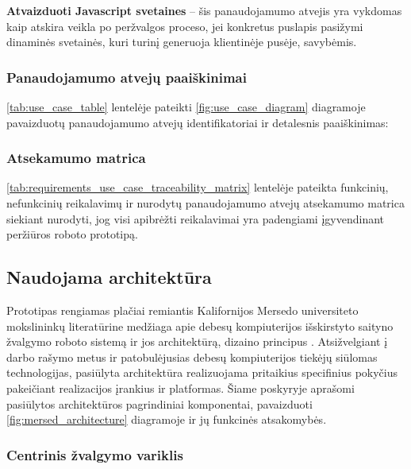 \textbf{Atvaizduoti Javascript svetaines} -- šis panaudojamumo atvejis yra vykdomas kaip atskira veikla po peržvalgos proceso, jei konkretus puslapis pasižymi dinaminės svetainės, kuri turinį generuoja klientinėje pusėje, savybėmis.

\subsubsection{Panaudojamumo atvejų paaiškinimai}
\ref{tab:use_case_table} lentelėje pateikti \ref{fig:use_case_diagram} diagramoje pavaizduotų panaudojamumo atvejų identifikatoriai ir detalesnis paaiškinimas:



\subsubsection{Atsekamumo matrica}

\ref{tab:requirements_use_case_traceability_matrix} lentelėje pateikta funkcinių, nefunkcinių reikalavimų ir nurodytų panaudojamumo atvejų atsekamumo matrica siekiant nurodyti, jog visi apibrėžti reikalavimai yra padengiami įgyvendinant peržiūros roboto prototipą.



\subsection{Naudojama architektūra}

Prototipas rengiamas plačiai remiantis Kalifornijos Mersedo universiteto mokslininkų literatūrine medžiaga apie debesų kompiuterijos išskirstyto saityno žvalgymo roboto sistemą ir jos architektūrą, dizaino principus \cite{MercedCloudBasedWebCrawler}. Atsižvelgiant į darbo rašymo metus ir patobulėjusias debesų kompiuterijos tiekėjų siūlomas technologijas, pasiūlyta architektūra realizuojama pritaikius specifinius pokyčius pakeičiant realizacijos įrankius ir platformas. Šiame poskyryje aprašomi pasiūlytos architektūros pagrindiniai komponentai, pavaizduoti \ref{fig:mersed_architecture} diagramoje ir jų funkcinės atsakomybės.

\pagebreak




\subsubsection{Centrinis žvalgymo variklis}
 
